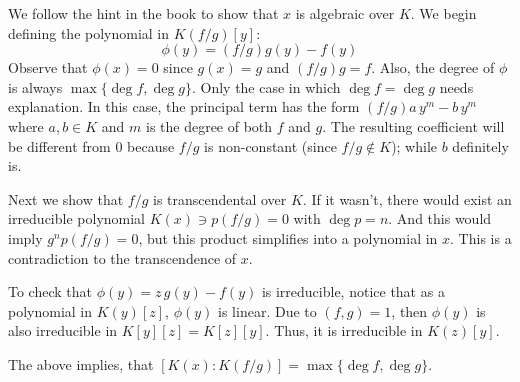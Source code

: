 We follow the hint in the book to show that $x$ is algebraic over $K$. 
We begin defining the polynomial in $K(f/g)[y]$:
$$\phi(y) = (f/g)g(y) - f(y)$$
Observe that $\phi(x) =0$ since $g(x)=g$ and $(f/g)g=f$. 
Also, the degree of $\phi$ is always $\max\{ \deg f, \deg g\}$. 
Only the case in which $\deg f= \deg g$ needs explanation. 
In this case, the principal term has the form $(f/g) a\, y^m - b\, y^m$ where $a,b\in K$ and $m$ is the degree of both $f$ and $g$.
The resulting coefficient will be different from 0 because $f/g$ is non-constant (since $f/g\notin K$); while $b$ definitely is.

Next we show that $f/g$ is transcendental over $K$.
If it wasn't, there would exist an irreducible polynomial $K(x) \ni p(f/g)=0$ with $\deg p = n$.
And this would imply $g^np(f/g)=0$, but this product simplifies into a polynomial in $x$.
This is a contradiction to the transcendence of $x$.

To check that $\phi(y)=z\,g(y)-f(y)$ is irreducible, notice that as a polynomial in $K(y)[z]$, $\phi(y)$ is linear. 
Due to $(f,g)=1$, then $\phi(y)$ is also irreducible in $K[y][z]=K[z][y]$.
Thus, it is irreducible in $K(z)[y]$.

The above implies, that $[K(x):K(f/g)]= \max\{ \deg f, \deg g\}$.


